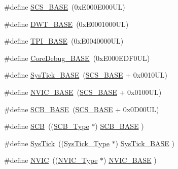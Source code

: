 \begin{DoxyCompactItemize}
\item 
\#define \mbox{\hyperlink{group___c_m_s_i_s__core__base_ga3c14ed93192c8d9143322bbf77ebf770}{S\+C\+S\+\_\+\+B\+A\+SE}}~(0x\+E000\+E000\+U\+L)
\item 
\#define \mbox{\hyperlink{group___c_m_s_i_s__core__base_gafdab534f961bf8935eb456cb7700dcd2}{D\+W\+T\+\_\+\+B\+A\+SE}}~(0x\+E0001000\+U\+L)
\item 
\#define \mbox{\hyperlink{group___c_m_s_i_s__core__base_ga2b1eeff850a7e418844ca847145a1a68}{T\+P\+I\+\_\+\+B\+A\+SE}}~(0x\+E0040000\+U\+L)
\item 
\#define \mbox{\hyperlink{group___c_m_s_i_s__core__base_ga680604dbcda9e9b31a1639fcffe5230b}{Core\+Debug\+\_\+\+B\+A\+SE}}~(0x\+E000\+E\+D\+F0\+U\+L)
\item 
\#define \mbox{\hyperlink{group___c_m_s_i_s__core__base_ga58effaac0b93006b756d33209e814646}{Sys\+Tick\+\_\+\+B\+A\+SE}}~(\mbox{\hyperlink{group___c_m_s_i_s__core__base_ga3c14ed93192c8d9143322bbf77ebf770}{S\+C\+S\+\_\+\+B\+A\+SE}} +  0x0010\+U\+L)
\item 
\#define \mbox{\hyperlink{group___c_m_s_i_s__core__base_gaa0288691785a5f868238e0468b39523d}{N\+V\+I\+C\+\_\+\+B\+A\+SE}}~(\mbox{\hyperlink{group___c_m_s_i_s__core__base_ga3c14ed93192c8d9143322bbf77ebf770}{S\+C\+S\+\_\+\+B\+A\+SE}} +  0x0100\+U\+L)
\item 
\#define \mbox{\hyperlink{group___c_m_s_i_s__core__base_gad55a7ddb8d4b2398b0c1cfec76c0d9fd}{S\+C\+B\+\_\+\+B\+A\+SE}}~(\mbox{\hyperlink{group___c_m_s_i_s__core__base_ga3c14ed93192c8d9143322bbf77ebf770}{S\+C\+S\+\_\+\+B\+A\+SE}} +  0x0\+D00\+U\+L)
\item 
\#define \mbox{\hyperlink{group___c_m_s_i_s__core__base_gaaaf6477c2bde2f00f99e3c2fd1060b01}{S\+CB}}~((\mbox{\hyperlink{struct_s_c_b___type}{S\+C\+B\+\_\+\+Type}}       $\ast$)     \mbox{\hyperlink{group___c_m_s_i_s__core__base_gad55a7ddb8d4b2398b0c1cfec76c0d9fd}{S\+C\+B\+\_\+\+B\+A\+SE}}         )
\item 
\#define \mbox{\hyperlink{group___c_m_s_i_s__core__base_gacd96c53beeaff8f603fcda425eb295de}{Sys\+Tick}}~((\mbox{\hyperlink{struct_sys_tick___type}{Sys\+Tick\+\_\+\+Type}}   $\ast$)     \mbox{\hyperlink{group___c_m_s_i_s__core__base_ga58effaac0b93006b756d33209e814646}{Sys\+Tick\+\_\+\+B\+A\+SE}}     )
\item 
\#define \mbox{\hyperlink{group___c_m_s_i_s__core__base_gac8e97e8ce56ae9f57da1363a937f8a17}{N\+V\+IC}}~((\mbox{\hyperlink{struct_n_v_i_c___type}{N\+V\+I\+C\+\_\+\+Type}}      $\ast$)     \mbox{\hyperlink{group___c_m_s_i_s__core__base_gaa0288691785a5f868238e0468b39523d}{N\+V\+I\+C\+\_\+\+B\+A\+SE}}        )

\end{DoxyCompactItemize}
